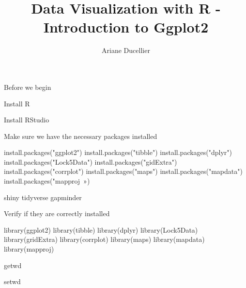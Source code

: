 \documentclass{beamer}
\title[Introduction to Ggplot2]{Data Visualization with R - Introduction to Ggplot2}
\author{Ariane Ducellier}
\begin{document}
	\begin{frame}
		\titlepage
	\end{frame}

	\begin{frame}


Before we begin

Install R

Install RStudio

Make sure we have the necessary packages installed

install.packages("ggplot2")
install.packages("tibble")
install.packages("dplyr")
install.packages("Lock5Data")
install.packages("gidExtra")
install.packages("corrplot")
install.packages("maps")
install.packages("mapdata")
install.packages("mapproj »)

shiny
tidyverse
gapminder

Verify if they are correctly installed

library(ggplot2)
library(tibble)
library(dplyr)
library(Lock5Data)
library(gridExtra)
library(corrplot)
library(maps)
library(mapdata)
library(mapproj)


getwd

setwd

	\end{frame}
\end{document}
